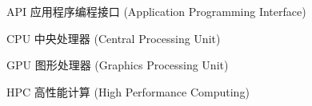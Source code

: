 \begin{denotation}

\item[API] 应用程序编程接口 (Application Programming Interface)
\item[CPU] 中央处理器 (Central Processing Unit)
\item[GPU] 图形处理器 (Graphics Processing Unit)
\item[HPC] 高性能计算 (High Performance Computing)
\end{denotation}
